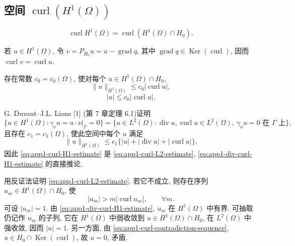 \hypertarget{appendix-01-page-331}{}
\subsection{空间 $\operatorname{curl}(H^1(\Omega))$}
\label{subsec:app1-curl-H1}

\begin{Lemma}
\label{lem:app1-curl-H1-H0}
\[
\operatorname{curl}H^1(\Omega)
=\operatorname{curl}(H^1(\Omega)\cap H_0).
\]
\end{Lemma}

\begin{Proof}
若 $u\in H^1(\Omega)$, 令 $v=P_{H_0}u=u-\operatorname{grad}q$, 其中 $\operatorname{grad}q\in\operatorname{Ker}(\operatorname{curl})$, 因而 $\operatorname{curl}v=\operatorname{curl}u$.
\end{Proof}

\begin{Lemma}
\label{lem:app1-curl-poincare}
存在常数 $c_0=c_0(\Omega)$, 使对每个 $u\in H^1(\Omega)\cap H_0$,
\begin{equation}
\lVert u\rVert_{H^1(\Omega)}\leq c_0|\operatorname{curl}u|,
\label{eq:app1-curl-H1-estimate}
\end{equation}
\begin{equation}
|u|\leq c_0|\operatorname{curl}u|.
\label{eq:app1-curl-L2-estimate}
\end{equation}
\end{Lemma}

\begin{Proof}
G. Duvaut--J.L. Lions [1] (第 7 章定理 6.1)证明
\begin{equation}
\{u\in H^1(\Omega):\gamma_\nu u=u\cdot\nu|_\Gamma=0\}
=\{u\in L^2(\Omega):\operatorname{div}u,\operatorname{curl}u\in L^2(\Omega),
\ \gamma_\nu u=0\text{ 在 }\Gamma\text{ 上}\},
\label{eq:app1-div-curl-trace-space}
\end{equation}
且存在 $c_1=c_1(\Omega)$, 使此空间中每个 $u$ 满足
\begin{equation}
\lVert u\rVert_{H^1(\Omega)}
\leq c_1\{|u|+|\operatorname{div}u|+|\operatorname{curl}u|\}.
\label{eq:app1-div-curl-H1-estimate}
\end{equation}
因此 \eqref{eq:app1-curl-H1-estimate} 是 \eqref{eq:app1-curl-L2-estimate}, \eqref{eq:app1-div-curl-H1-estimate} 的直接推论.

用反证法证明 \eqref{eq:app1-curl-L2-estimate}. 若它不成立, 则存在序列 $u_m\in H^1(\Omega)\cap H_0$, 使
\begin{equation}
|u_m|>m|\operatorname{curl}u_m|,
\qquad\forall m.
\label{eq:app1-curl-contradiction-sequence}
\end{equation}
可设 $|u_m|=1$. 由 \eqref{eq:app1-div-curl-H1-estimate}, $u_m$ 在 $H^1(\Omega)$ 中有界. 可抽取仍记作 $u_m$ 的子列, 它在 $H^1(\Omega)$ 中弱收敛到 $u\in H^1(\Omega)\cap H_0$, 在 $L^2(\Omega)$ 中强收敛, 因而 $|u|=1$. 另一方面, 由 \eqref{eq:app1-curl-contradiction-sequence}, $u\in H_0\cap\operatorname{Ker}(\operatorname{curl})$, 故 $u=0$, 矛盾.
\end{Proof}


